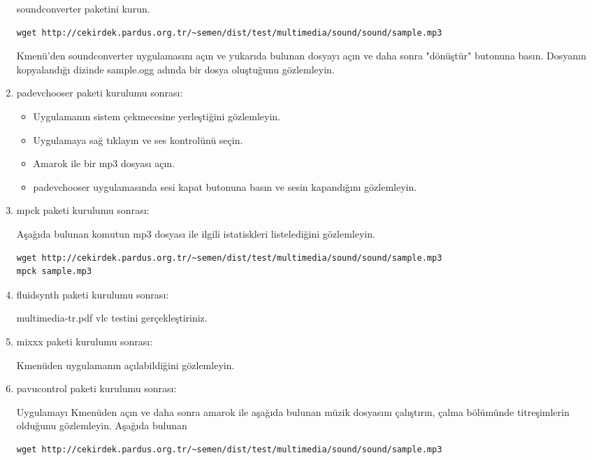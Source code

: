 \documentclass[a4paper,10pt]{article}
\begin{document}
\begin{enumerate}
soundconverter paketini kurun. 

\begin{verbatim}
wget http://cekirdek.pardus.org.tr/~semen/dist/test/multimedia/sound/sound/sample.mp3
\end{verbatim}

Kmenü'den soundconverter uygulamasını açın ve yukarıda bulunan dosyayı açın ve daha sonra "dönüştür" butonuna basın. Dosyanın kopyalandığı dizinde sample.ogg adında bir dosya oluştuğunu gözlemleyin.

\item padevchooser paketi kurulumu sonrası:

\begin{itemize}
 \item Uygulamanın sistem çekmecesine yerleştiğini gözlemleyin. 
 \item Uygulamaya sağ tıklayın ve ses kontrolünü seçin.
 \item Amarok ile bir mp3 dosyası açın.
 \item padevchooser uygulamasında sesi kapat butonuna basın ve sesin kapandığını gözlemleyin.
\end{itemize}

\item mpck paketi kurulumu sonrası:

Aşağıda bulunan komutun mp3 dosyası ile ilgili istatiskleri listelediğini gözlemleyin.
\begin{verbatim}
wget http://cekirdek.pardus.org.tr/~semen/dist/test/multimedia/sound/sound/sample.mp3 
mpck sample.mp3
\end{verbatim}


\item fluidsynth paketi kurulumu sonrası:

multimedia-tr.pdf vlc testini gerçekleştiriniz.

\item mixxx paketi kurulumu sonrası:

Kmenüden uygulamanın açılabildiğini gözlemleyin.

\item pavucontrol paketi kurulumu sonrası:

Uygulamayı Kmenüden açın ve daha sonra amarok ile aşağıda bulunan müzik dosyasını çalıştırın, çalma bölümünde titreşimlerin olduğunu gözlemleyin.
Aşağıda bulunan
\begin{verbatim}
wget http://cekirdek.pardus.org.tr/~semen/dist/test/multimedia/sound/sound/sample.mp3
\end{verbatim}


\end{enumerate}
\end{document}

